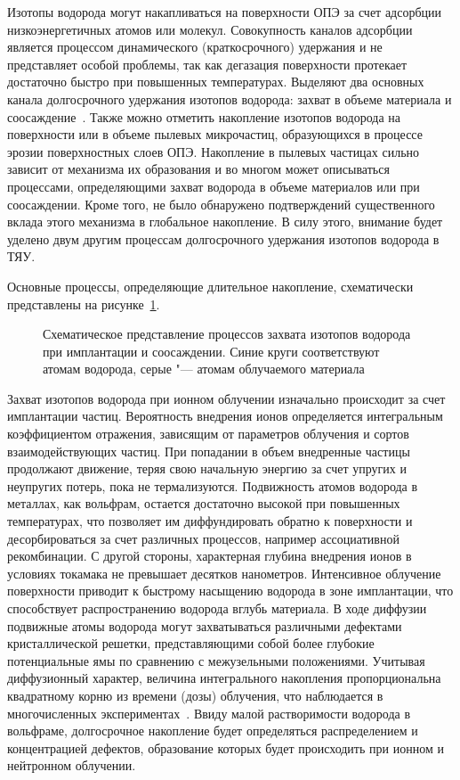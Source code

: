 Изотопы водорода могут накапливаться на поверхности ОПЭ за счет адсорбции низкоэнергетичных атомов или молекул. Совокупность каналов адсорбции является процессом динамического (краткосрочного) удержания и не представляет особой проблемы, так как дегазация поверхности протекает достаточно быстро при повышенных температурах. Выделяют два основных канала долгосрочного удержания изотопов водорода: захват в объеме материала и соосаждение~\cite{Gasparyan2024, Skinner2009}. Также можно отметить накопление изотопов водорода на поверхности или в объеме пылевых микрочастиц, образующихся в процессе эрозии поверхностных слоев ОПЭ. Накопление в пылевых частицах сильно зависит от механизма их образования и во многом может описываться процессами, определяющими захват водорода в объеме материалов или при соосаждении. Кроме того, не было обнаружено подтверждений существенного вклада этого механизма в глобальное накопление. В силу этого, внимание будет уделено двум другим процессам долгосрочного удержания изотопов водорода в ТЯУ.

Основные процессы, определяющие длительное накопление, схематически представлены на рисунке~\cref{fig:ch1/retention_mechanisms}.
\begin{figure}[ht]
    \caption{Схематическое представление процессов захвата изотопов водорода при имплантации и соосаждении. Синие круги соответствуют атомам водорода, серые "--- атомам облучаемого материала}\label{fig:ch1/retention_mechanisms}
\end{figure}
Захват изотопов водорода при ионном облучении изначально происходит за счет имплантации частиц. Вероятность внедрения ионов определяется интегральным коэффициентом отражения, зависящим от параметров облучения и сортов взаимодействующих частиц. При попадании в объем внедренные частицы продолжают движение, теряя свою начальную энергию за счет упругих и неупругих потерь, пока не термализуются. Подвижность атомов водорода в металлах, как вольфрам, остается достаточно высокой при повышенных температурах, что позволяет им диффундировать обратно к поверхности и десорбироваться за счет различных процессов, например ассоциативной рекомбинации. С другой стороны, характерная глубина внедрения ионов в условиях токамака не превышает десятков нанометров. Интенсивное облучение поверхности приводит к быстрому насыщению водорода в зоне имплантации, что способствует распространению водорода вглубь материала. В ходе диффузии подвижные атомы водорода могут захватываться различными дефектами кристаллической решетки, представляющими собой более глубокие потенциальные ямы по сравнению с межузельными положениями. Учитывая диффузионный характер, величина интегрального накопления пропорциональна квадратному корню из времени (дозы) облучения, что наблюдается в многочисленных экспериментах~\cite{Ogorodnikova2003,Ogorodnikova2009,Sugiyama2014,Zhang2020}. Ввиду малой растворимости водорода в вольфраме, долгосрочное накопление будет определяться распределением и концентрацией дефектов, образование которых будет происходить при ионном и нейтронном облучении.

